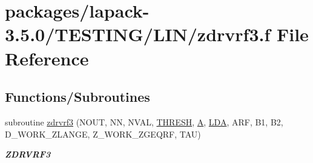 \hypertarget{zdrvrf3_8f}{}\section{packages/lapack-\/3.5.0/\+T\+E\+S\+T\+I\+N\+G/\+L\+I\+N/zdrvrf3.f File Reference}
\label{zdrvrf3_8f}
\subsection*{Functions/\+Subroutines}
\begin{DoxyCompactItemize}
\item 
subroutine \hyperlink{group__complex16__lin_gab3f02d272b3c8a21b67d6bfb3ae5ffb4}{zdrvrf3} (N\+O\+U\+T, N\+N, N\+V\+A\+L, \hyperlink{zlaqgs_8c_a0656018abfc9fa2821827415f5d5ea57}{T\+H\+R\+E\+S\+H}, \hyperlink{classA}{A}, \hyperlink{example__user_8c_ae946da542ce0db94dced19b2ecefd1aa}{L\+D\+A}, A\+R\+F, B1, B2, D\+\_\+\+W\+O\+R\+K\+\_\+\+Z\+L\+A\+N\+G\+E, Z\+\_\+\+W\+O\+R\+K\+\_\+\+Z\+G\+E\+Q\+R\+F, T\+A\+U)
\begin{DoxyCompactList}\small\item\em {\bfseries Z\+D\+R\+V\+R\+F3} \end{DoxyCompactList}\end{DoxyCompactItemize}
